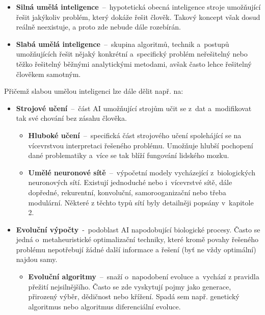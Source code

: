 \documentclass[a4paper,12pt]{article}
\begin{document}
{{{{{{{{\begin{itemize}
\item \textbf{Silná umělá inteligence}~--~hypotetická obecná inteligence stroje umožňující řešit jakýkoliv problém, který dokáže řešit člověk. Takový koncept však dosud reálně neexistuje, a proto zde nebude dále rozebírán.
\item \textbf{Slabá umělá inteligence}~--~skupina algoritmů, technik a~postupů umožňujících řešit nějaký konkrétní a~specifický problém neřešitelný nebo těžko řešitelný běžnými analytickými metodami, avšak často lehce řešitelný člověkem samotným.

\end{itemize}

Přičemž slabou umělou inteligenci lze dále dělit např. na:

\begin{itemize}
\item \textbf{Strojové učení}~--~část AI umožňující strojům učit se z~dat a~modifikovat tak své chování bez zásahu člověka.

\begin{itemize}

\item \textbf{Hluboké učení}~--~specifická část strojového učení spolehájící se na vícevrstvou interpretaci řešeného problému. Umožňuje hlubší pochopení dané problematiky a~více se tak blíží fungování lidského mozku.

\item \textbf{Umělé neuronové sítě}~--~výpočetní modely vycházející z~biologických neuronových sítí. Existují jednoduché nebo i~vícevrstvé sítě, dále dopředné, rekurentní, konvoluční, samorooganizační nebo třeba modulární. Některé z těchto typů sítí byly detailněji popsány v~kapitole 2.

\end{itemize}

\item \textbf{Evoluční výpočty}~-~podoblast AI napodobující biologické procesy. Často se jedná o~metaheuristické optimalizační techniky, které kromě povahy řešeného problému nepotřebují žádné další informace a řešení (byť ne vždy optimální) najdou samy.

\begin{itemize}
\item \textbf{Evoluční algoritmy}~--~snaží o~napodobení evoluce a~vychází z pravidla přežití nejsilnějšího. Často se zde vyskytují pojmy jako generace, přirozený výběr, dědičnost nebo křížení. Spadá sem např. genetický algoritmus nebo algoritmus diferenciální evoluce.


\end{itemize}
\end{itemize}}}}}}}}}
\end{document}
